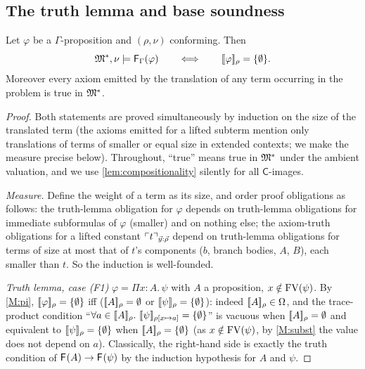 \subsection{The truth lemma and base soundness}

\begin{theorem}
\label{thm:truth}
Let $\varphi$ be a $\Gamma$-proposition and $(\rho, \nu)$
conforming.  Then
\[
  \mathfrak{M}^{*}, \nu \models \mathsf{F}_{\Gamma}(\varphi)
  \qquad\Longleftrightarrow\qquad
  [\![ \varphi ]\!]_{\rho} = \{\emptyset\} .
\]
Moreover every axiom emitted by the translation of any term
occurring in the problem is true in $\mathfrak{M}^{*}$.
\end{theorem}

\begin{proof}
Both statements are proved simultaneously by induction on the size
of the translated term (the axioms emitted for a lifted subterm
mention only translations of terms of smaller or equal size in
extended contexts; we make the measure precise below).  Throughout,
``true'' means true in $\mathfrak{M}^{*}$ under the ambient valuation, and we
use \cref{lem:compositionality} silently for all $\mathsf{C}$-images.

\emph{Measure.}  Define the weight of a term as its size, and order
proof obligations as follows: the truth-lemma obligation for
$\varphi$ depends on truth-lemma obligations for immediate
subformulas of $\varphi$ (smaller) and on nothing else; the
axiom-truth obligations for a lifted constant
$\ulcorner t \urcorner_{\vec{y}:\vec{\rho}}$ depend on truth-lemma obligations
for terms of size at most that of $t$'s components ($b$, branch
bodies, $A$, $B$), each smaller than $t$.  So the induction is
well-founded.

\emph{Truth lemma, case (F1)} $\varphi = \Pi x{:}A.\,\psi$ with $A$
a proposition, $x \notin \mathrm{FV}(\psi)$.  By \ref{M:pi},
$[\![ \varphi ]\!]_{\rho} = \{\emptyset\}$ iff ($[\![ A ]\!]_{\rho} = \emptyset$ or
$[\![ \psi ]\!]_{\rho} = \{\emptyset\}$): indeed $[\![ A ]\!]_{\rho} \in \Omega$, and
the trace-product condition ``$\forall a \in [\![ A ]\!]_{\rho}.\
[\![ \psi ]\!]_{\rho[x \mapsto a]} = \{\emptyset\}$'' is vacuous when
$[\![ A ]\!]_{\rho} = \emptyset$ and equivalent to $[\![ \psi ]\!]_{\rho} =
\{\emptyset\}$ when $[\![ A ]\!]_{\rho} = \{\emptyset\}$ (as $x \notin \mathrm{FV}(\psi)$,
by \ref{M:subst} the value does not depend on $a$).  Classically,
the right-hand side is exactly the truth condition of
$\mathsf{F}_{}(A) \to \mathsf{F}_{}(\psi)$ by the induction hypothesis for $A$ and
$\psi$.


\end{proof}

